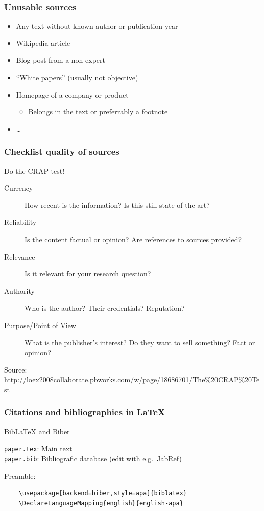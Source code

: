 \documentclass{beamer}
\begin{document}
\begin{frame}
  \frametitle{Unusable sources}

  \begin{itemize}
    \item Any text without known author or publication year
    \item Wikipedia article
    \item Blog post from a non-expert
    \item ``White papers'' (usually not objective)
    \item Homepage of a company or product
      \begin{itemize}
        \item Belongs in the text or preferrably a footnote
      \end{itemize}
    \item \dots
  \end{itemize}
\end{frame}

\begin{frame}
  \frametitle{Checklist quality of sources}

  Do the CRAP test!

  \begin{description}
    \item[Currency] How recent is the information? Is this still state-of-the-art?
    \item[Reliability] Is the content factual or opinion? Are references to sources provided?
    \item[Relevance] Is it relevant for your research question?
    \item[Authority] Who is the author? Their credentials? Reputation?
    \item[Purpose/Point of View] What is the publisher's interest? Do they want to sell something? Fact or opinion?
  \end{description}

  Source: \url{http://loex2008collaborate.pbworks.com/w/page/18686701/The\%20CRAP\%20Test}
\end{frame}

\begin{frame}[fragile]
  \frametitle{Citations and bibliographies in {\LaTeX}}
  
  Bib{\LaTeX} and Biber

  \vspace{18pt}

  \verb|paper.tex|: Main text\\
  \verb|paper.bib|: Bibliografic database (edit with e.g.~JabRef)

  \vspace{18pt}
  
  Preamble:
  
  \begin{verbatim}
    \usepackage[backend=biber,style=apa]{biblatex}
    \DeclareLanguageMapping{english}{english-apa}
    
  \end{verbatim}

\end{frame}
\end{document}
